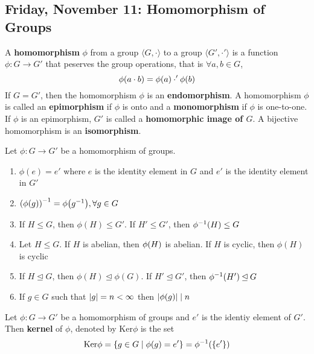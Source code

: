 \subsection{Friday, November 11: Homomorphism of Groups}

\begin{definition}[Homomorphism]
    A \textbf{homomorphism} $\phi$ from a group $\langle G, \cdot \rangle$ to a group $\langle G', \cdot' \rangle$ is a function $\phi : G \to G'$ that peserves the group operations, that is $\forall a, b \in G$, 
    \[ \phi \qty(a \cdot b) = \phi \qty(a) \cdot' \phi \qty(b) \]
    If $G=G'$, then the homomorphism $\phi$ is an \textbf{endomorphism}. A homomorphism $\phi$ is called an \textbf{epimorphism} if $\phi$ is onto and a \textbf{monomorphism} if $\phi$ is one-to-one. If $\phi$ is an epimorphism, $G'$ is called a \textbf{homomorphic image of $G$}. A bijective homomorphism is an \textbf{isomorphism}.
\end{definition}

\begin{theorem}
    Let $\phi: G\to G'$ be a homomorphism of groups.
	\begin{enumerate}
	    \item $\phi (e) = e'$ where $e$ is the identity element in $G$ and $e'$ is the identity element in $G'$
	    \item $\qty(\phi \qty(g))^{-1} = \phi \qty(g^{-1}), \forall g \in G$
	    \item  If $H \leq G$, then $\phi (H) \leq G'$. If $H' \leq G'$, then $\phi^{-1} \qty(H) \leq G$
	    \item Let $H \leq G$. If $H$ is abelian, then $\phi \qty(H)$ is abelian. If $H$ is cyclic, then $\phi (H)$ is cyclic
	    \item If $H \unlhd G$, then $\phi (H) \unlhd \phi (G)$. If $H' \unlhd G'$, then $\phi^{-1} \qty(H') \unlhd G$
	    \item If $g \in G$ such that $\qty|g| = n < \infty$ then $\qty|\phi \qty(g)| \mid n$
	\end{enumerate}
\end{theorem}

\begin{definition}[Kernel]
    Let $\phi : G \to G'$ be a homomorphism of groups and $e'$ is the identiy element of $G'$. Then \textbf{kernel} of $\phi$, denoted by $\text{Ker} \phi$ is the set
    \[ \text{Ker} \phi = \qty{g \in G \mid \phi (g) = e'} = \phi^{-1} \qty(\qty{e'})\]
\end{definition}

